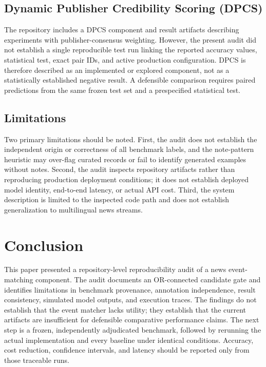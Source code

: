 \documentclass[conference]{IEEEtran}
\begin{document}
\subsection{Dynamic Publisher Credibility Scoring (DPCS)}
The repository includes a DPCS component and result artifacts describing experiments with publisher-consensus weighting. However, the present audit did not establish a single reproducible test run linking the reported accuracy values, statistical test, exact pair IDs, and active production configuration. DPCS is therefore described as an implemented or explored component, not as a statistically established negative result. A defensible comparison requires paired predictions from the same frozen test set and a prespecified statistical test.

\subsection{Limitations}
Two primary limitations should be noted.
First, the audit does not establish the independent origin or correctness of all benchmark labels, and the note-pattern heuristic may over-flag curated records or fail to identify generated examples without notes. Second, the audit inspects repository artifacts rather than reproducing production deployment conditions; it does not establish deployed model identity, end-to-end latency, or actual API cost. Third, the system description is limited to the inspected code path and does not establish generalization to multilingual news streams.

\section{Conclusion}

This paper presented a repository-level reproducibility audit of a news event-matching component. The audit documents an OR-connected candidate gate and identifies limitations in benchmark provenance, annotation independence, result consistency, simulated model outputs, and execution traces. The findings do not establish that the event matcher lacks utility; they establish that the current artifacts are insufficient for defensible comparative performance claims. The next step is a frozen, independently adjudicated benchmark, followed by rerunning the actual implementation and every baseline under identical conditions. Accuracy, cost reduction, confidence intervals, and latency should be reported only from those traceable runs.
\end{document}

